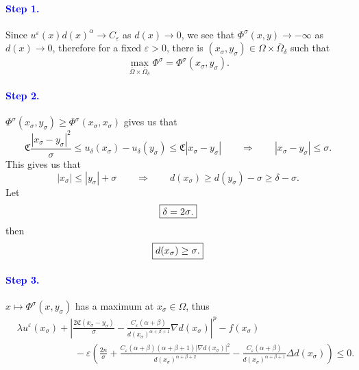 \documentclass[11pt,reqno]{amsart}
\numberwithin{figure}{section}
\theoremstyle{plain}
\theoremstyle{remark}
\numberwithin{equation}{section}
\begin{document}
\paragraph{\textcolor{blue}{\textbf{Step 1.}}} Since $u^\varepsilon (x)d(x)^\alpha \to C_\varepsilon$ as $d(x)\to 0$, we see that $\Phi^\sigma(x,y)\to -\infty$ as $d(x)\to 0$, therefore for a fixed $\varepsilon>0$, there is $(x_{\sigma},y_\sigma)\in \Omega\times\overline{\Omega}_\delta$ such that 
\begin{equation*}
    \max_{\overline{\Omega}\times \overline{\Omega}_\delta} \Phi^\sigma = \Phi^\sigma(x_\sigma,y_\sigma).
\end{equation*}
\paragraph{\textcolor{blue}{\textbf{Step 2.}}} $\Phi^\sigma(x_\sigma,y_\sigma) \geq \Phi^\sigma(x_\sigma,x_\sigma)$ gives us that
    \begin{equation}\label{e:est_sigma2}
        \mathfrak{C}\frac{|x_\sigma-y_\sigma|^2}{\sigma} \leq u_\delta(x_\sigma) - u_\delta(y_\sigma) \leq \mathfrak{C}|x_\sigma-y_\sigma| \qquad\Longrightarrow\qquad |x_\sigma -y _\sigma|\leq \sigma.
    \end{equation}
    This gives us that
    \begin{equation}\label{e:est_sigma3}
        |x_\sigma|\leq |y_\sigma|+\sigma \qquad\Longrightarrow\qquad d(x_\sigma) \geq d(y_\sigma) - \sigma\geq \delta-\sigma.
    \end{equation}
Let 
\begin{equation*}
   \fbox{$\displaystyle \delta = 2\sigma$.}
\end{equation*}
then 
\begin{equation*}
    \fbox{$d(x_\sigma) \geq \sigma$.}
\end{equation*}
\paragraph{\textcolor{blue}{\textbf{Step 3.}}} $x\mapsto \Phi^\sigma(x,y_\sigma)$ has a maximum at $x_\sigma\in \Omega$, thus 
\begin{align*}
    &\lambda u^\varepsilon(x_\sigma) + \left|\frac{2\mathfrak{C}(x_\sigma-y_\sigma)}{\sigma} - \frac{C_\varepsilon(\alpha+\beta)}{d(x_\sigma)^{\alpha+\beta+1}}\nabla d(x_\sigma )\right|^p - f(x_\sigma)\\
    &\qquad\qquad\qquad -\varepsilon\left(\frac{2n}{\sigma} + \frac{C_\varepsilon(\alpha+\beta)(\alpha+\beta+1)|\nabla d(x_\sigma)|^2}{d(x_\sigma)^{\alpha+\beta+2}}-\frac{C_\varepsilon(\alpha+\beta)}{d(x_\sigma)^{\alpha+\beta+1}}\Delta d(x_\sigma)\right)  \leq 0.
\end{align*}
\end{document}
